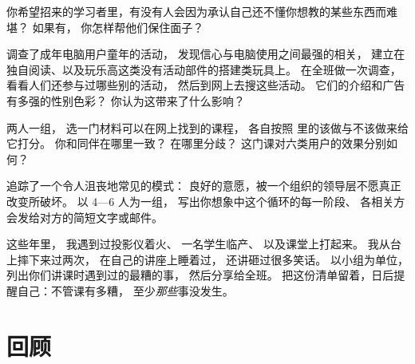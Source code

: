 
你希望招来的学习者里，有没有人会因为承认自己还不懂你想教的某些东西而难堪？
如果有，
你怎样帮他们保住面子？


\cite{Cutt2017}调查了成年电脑用户童年的活动，
发现信心与电脑使用之间最强的相关，
建立在独自阅读、以及玩乐高这类没有活动部件的搭建类玩具上。
在全班做一次调查，看看人们还参与过哪些别的活动，
然后到网上去搜这些活动。
它们的介绍和广告有多强的性别色彩？
你认为这带来了什么影响？


两人一组，
选一门材料可以在网上找到的课程，
各自按照
里的该做与不该做来给它打分。
你和同伴在哪里一致？
在哪里分歧？
这门课对六类用户的效果分别如何？


\cite{Coco2018}追踪了一个令人沮丧地常见的模式：
良好的意愿，被一个组织的领导层不愿真正改变所破坏。
以 4—6 人为一组，
写出你想象中这个循环的每一阶段、
各相关方会发给对方的简短文字或邮件。


这些年里，
我遇到过投影仪着火、
一名学生临产、
以及课堂上打起来。
我从台上摔下来过两次，
在自己的讲座上睡着过，
还讲砸过很多笑话。
以小组为单位，
列出你们讲课时遇到过的最糟的事，
然后分享给全班。
把这份清单留着，日后提醒自己：不管课有多糟，
至少\emph{那些}事没发生。

\section*{回顾}

